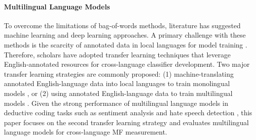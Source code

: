 \paragraph{Multilingual Language Models}
To overcome the limitations of bag-of-words methods, literature has suggested machine learning and deep learning approaches. A primary challenge with these methods is the scarcity of annotated data in local languages for model training \citep[e.g.,][]{ji2024moralbench, nguyen2024measuring}. Therefore, scholars have adopted transfer learning techniques that leverage English-annotated resources for cross-language classifier development. Two major transfer learning strategies are commonly proposed: (1) machine-translating annotated English-language data into local languages to train monolingual models \citep{schuster2019cross}, or (2) using annotated English-language data to train multilingual models \citep{barriere2020improving}. Given the strong performance of multilingual language models in deductive coding tasks such as sentiment analysis \citep[e.g.,][]{barriere2020improving} and hate speech detection \citep[e.g.,][]{rottger2022data}, this paper focuses on the second transfer learning strategy and evaluates multilingual language models for cross-language MF measurement. 




